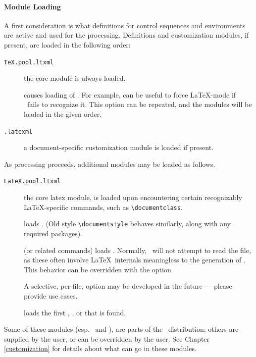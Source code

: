 \documentclass{report}
\begin{document}
\paragraph{Module Loading}
A first consideration is what definitions for control sequences and
environments are active and used for the processing.
Definitions and customization modules, if present, are loaded in the following
order:
\begin{description}
  \item[\texttt{TeX.pool.ltxml}] the core module is always loaded.
  \item[] causes loading of .
    For example,  can be useful to force \LaTeX-mode
    if \LaTeXML\ fails to recognize it.
    This option can be repeated, and the modules will be loaded in the
    given order.
  \item[\texttt{.latexml}] a document-specific customization module
    is loaded if present.
\end{description}
As processing proceeds, additional modules may be loaded as follows.
\begin{description}
  \item[\texttt{LaTeX.pool.ltxml}] the core latex module, is loaded
    upon encountering certain recognizably \LaTeX-specific commands, such as
    \verb|\documentclass|.
  \item[]
     loads .
     (Old style \verb|\documentstyle| behaves similarly, along with any required packages).
  \item[] (or related commands) loads
    .  Normally, \LaTeXML\ will not
    attempt to read the  file, as these
    often involve \LaTeX\ internals meaningless to the generation of \XML.
    This behavior can be overridden with the option
    \begin{quote}
    \end{quote}
    A selective, per-file, option may be developed in the future --- please
    provide use cases.
  \item[] loads the first
    , , 
     or  that is found.
\end{description}
Some of these modules (esp.~ and ), are parts of
the \LaTeXML\ distribution; others are supplied by the user, or can be
overridden by the user.
See Chapter \ref{customization} for details about what can go in these modules.
\end{document}

